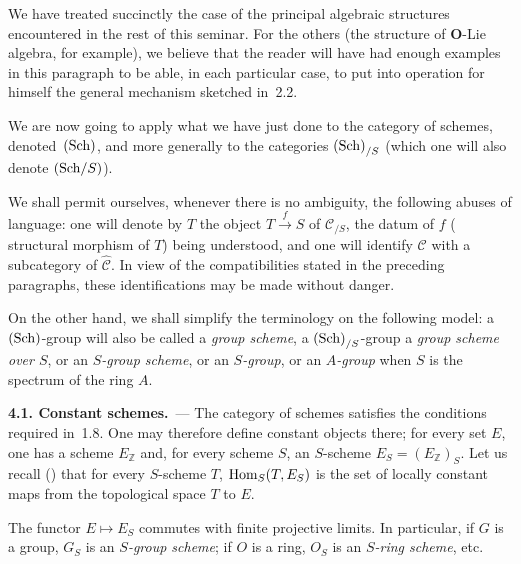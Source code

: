 We have treated succinctly the case of the principal algebraic structures
encountered in the rest of this seminar. For the others (the structure of
\(\mathbf{O}\)-Lie algebra, for example), we believe that the reader will
have had enough examples in this paragraph to be able, in each particular
case, to put into operation for himself the general mechanism sketched
in~2.2.

We are now going to apply what we have just done to the category of schemes,
denoted~\(\textup{(Sch)}\), and more generally to the categories \(\textup{(Sch)}_{/S}\) (which
one will also denote \((\textup{Sch}/S)\)).

\label{I.sec.4}

We shall permit ourselves, whenever there is no ambiguity, the following
abuses of language: one will denote by \(T\) the object
\(T\xrightarrow{f}S\) of \(\mathcal{C}_{/S}\), the datum of \(f\) (\og
structural morphism of \(T\)\fg) being understood, and one will identify
\(\mathcal{C}\) with a subcategory of \(\widehat{\mathcal{C}}\). In view of
the compatibilities stated in the preceding paragraphs, these
identifications may be made without danger.

On the other hand, we shall simplify the terminology on the following model:
a \(\textup{(Sch)}\)-group will also be called a \emph{group scheme}, a
\(\textup{(Sch)}_{/S}\)-group a \emph{group scheme over \(S\)}, or an \emph{\(S\)-group
scheme}, or an \emph{\(S\)-group}, or an \emph{\(A\)-group} when \(S\) is the
spectrum of the ring \(A\).

\par{}
\noindent\textbf{4.1. Constant schemes.}\label{I.4.1}\ ---
The category of schemes satisfies the conditions required in~1.8. One may
therefore define constant objects there; for every set \(E\), one has a
scheme \(E_{\mathbb{Z}}\) and, for every scheme \(S\), an \(S\)-scheme
\(E_S=(E_{\mathbb{Z}})_S\). Let us recall (\cf\loccit) that for every
\(S\)-scheme \(T\), \(\operatorname{Hom}_S(T,E_S)\) is the set of locally constant maps from
the topological space \(T\) to \(E\).

The functor \(E\mapsto E_S\) commutes with finite projective limits. In
particular, if \(G\) is a group, \(G_S\) is an \emph{\(S\)-group scheme}; if
\(O\) is a ring, \(O_S\) is an \emph{\(S\)-ring scheme}, etc.

